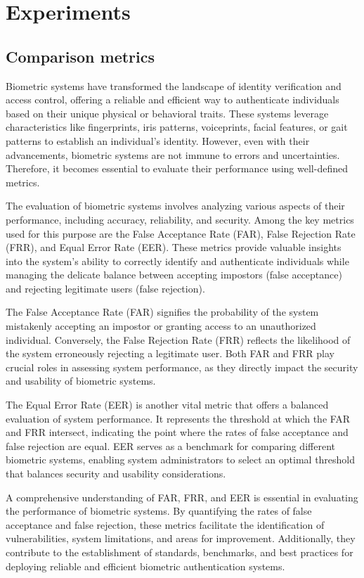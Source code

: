 \section{Experiments}

\subsection{Comparison metrics}

Biometric systems have transformed the landscape of identity verification and access control, offering a reliable and efficient way to authenticate individuals based on their unique physical or behavioral traits. These systems leverage characteristics like fingerprints, iris patterns, voiceprints, facial features, or gait patterns to establish an individual's identity. However, even with their advancements, biometric systems are not immune to errors and uncertainties. Therefore, it becomes essential to evaluate their performance using well-defined metrics.

The evaluation of biometric systems involves analyzing various aspects of their performance, including accuracy, reliability, and security. Among the key metrics used for this purpose are the False Acceptance Rate (FAR), False Rejection Rate (FRR), and Equal Error Rate (EER). These metrics provide valuable insights into the system's ability to correctly identify and authenticate individuals while managing the delicate balance between accepting impostors (false acceptance) and rejecting legitimate users (false rejection).

The False Acceptance Rate (FAR) signifies the probability of the system mistakenly accepting an impostor or granting access to an unauthorized individual. Conversely, the False Rejection Rate (FRR) reflects the likelihood of the system erroneously rejecting a legitimate user. Both FAR and FRR play crucial roles in assessing system performance, as they directly impact the security and usability of biometric systems.

The Equal Error Rate (EER) is another vital metric that offers a balanced evaluation of system performance. It represents the threshold at which the FAR and FRR intersect, indicating the point where the rates of false acceptance and false rejection are equal. EER serves as a benchmark for comparing different biometric systems, enabling system administrators to select an optimal threshold that balances security and usability considerations.

A comprehensive understanding of FAR, FRR, and EER is essential in evaluating the performance of biometric systems. By quantifying the rates of false acceptance and false rejection, these metrics facilitate the identification of vulnerabilities, system limitations, and areas for improvement. Additionally, they contribute to the establishment of standards, benchmarks, and best practices for deploying reliable and efficient biometric authentication systems.

